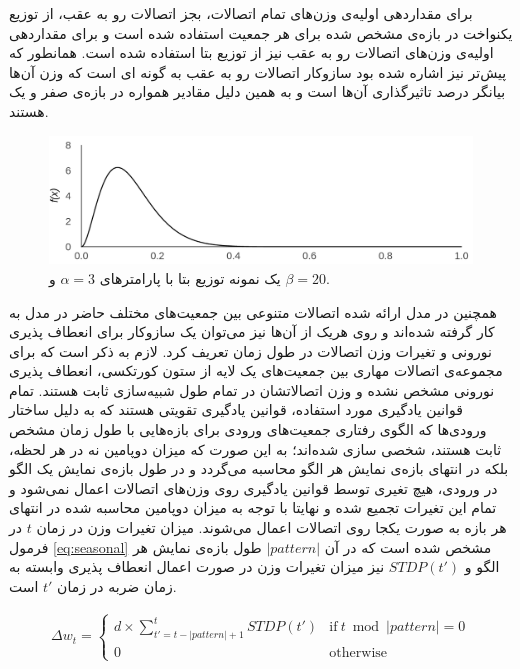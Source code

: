 \documentclass[12pt]{report}
\begin{document}
	برای مقداردهی اولیه‌ی وزن‌های تمام اتصالات، بجز اتصالات رو به عقب، از توزیع یکنواخت در بازه‌ی مشخص شده برای هر جمعیت استفاده شده است و برای مقداردهی اولیه‌ی وزن‌های اتصالات رو به عقب نیز از توزیع بتا استفاده شده است. همانطور که پیش‌تر نیز اشاره شده بود سازوکار اتصالات رو به عقب به گونه ای است که وزن آن‌ها بیانگر درصد تاثیرگذاری آن‌ها است و به همین دلیل مقادیر همواره در بازه‌ی صفر و یک هستند.
	
	\begin{figure}[]
		\centering
		\includegraphics[width=0.8\linewidth]{beta-3-20.png}
		\caption[NS]{
			یک نمونه توزیع بتا با پارامتر‌های $\alpha=3$ و $\beta=20$.
		}
		\label{fig:beta} 
	\end{figure}
	
	همچنین در مدل ارائه شده اتصالات متنوعی بین جمعیت‌های مختلف حاضر در مدل به کار گرفته شده‌اند و روی هریک از آن‌ها نیز می‌توان یک سازوکار برای انعطاف پذیری نورونی و تغیرات وزن اتصالات در طول زمان تعریف کرد. لازم به ذکر است که برای مجموعه‌ی اتصالات مهاری بین جمعیت‌های یک لایه از ستون کورتکسی، انعطاف پذیری نورونی مشخص نشده و وزن اتصالاتشان در تمام طول شبیه‌سازی ثابت هستند. تمام قوانین یادگیری مورد استفاده، قوانین یادگیری تقویتی هستند که به دلیل ساختار ورودی‌ها که الگوی رفتاری جمعیت‌های ورودی برای بازه‌هایی با طول زمان مشخص ثابت هستند، شخصی سازی شده‌اند؛ به این صورت که میزان دوپامین نه در هر لحظه، بلکه در انتهای بازه‌ی نمایش هر الگو محاسبه می‌گردد و در طول بازه‌ی نمایش یک الگو در ورودی، هیچ تغیری توسط قوانین یادگیری روی وزن‌های اتصالات اعمال نمی‌شود و تمام این تغیرات تجمیع شده و نهایتا با توجه به میزان دوپامین محاسبه شده در انتهای هر بازه به صورت یکجا روی اتصالات اعمال می‌شوند. میزان تغیرات وزن در زمان $t$ در فرمول \ref{eq:seasonal} مشخص شده است که در آن $|pattern|$ طول بازه‌ی نمایش هر الگو و $STDP(t')$ نیز میزان تغیرات وزن در صورت اعمال انعطاف پذیری وابسته به زمان ضربه در زمان $t'$ است.
	
	\begin{align}
		\Delta w_t =
		\begin{cases}
			d \times \sum_{t'=t-\left | pattern \right |+1}^{t} STDP(t') & \text{if}~t\bmod\left | pattern \right | = 0\\
			0 & \text{otherwise}
		\end{cases}  
		\label{eq:seasonal}
	\end{align}
	
\end{document}
